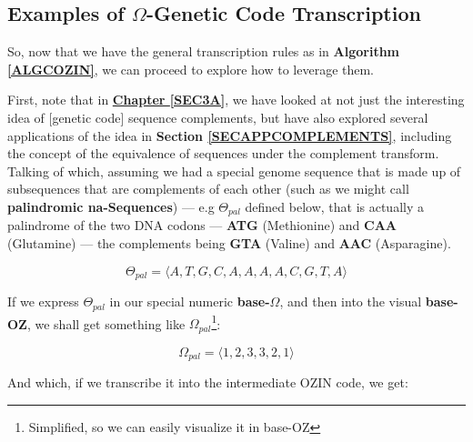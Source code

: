 \documentclass[a4paper, 18pt]{book} %
\begin{document}
\subsection{Examples of $\Omega$-Genetic Code Transcription}
\label{SECEXAMTRANSC}

So, now that we have the general transcription rules as in \textbf{Algorithm \ref{ALGCOZIN}}, we can proceed to explore how to leverage them. 

First, note that in \textbf{\hyperref[SEC3A]{Chapter \ref{SEC3A}}}, we have looked at not just the interesting idea of [genetic code] sequence complements, but have also explored several applications of the idea in \textbf{Section \ref{SECAPPCOMPLEMENTS}}, including the concept of the equivalence of sequences under the complement transform. Talking of which, assuming we had a special genome sequence that is made up of subsequences that are complements of each other (such as we might call \textbf{palindromic na-Sequences}) --- e.g $\Theta_{pal}$ defined below, that is actually a palindrome of the two DNA codons --- \textbf{ATG} (Methionine) and \textbf{CAA} (Glutamine) --- the complements being \textbf{GTA} (Valine) and \textbf{AAC} (Asparagine)\cite{wikipedia_codon_tables}.

\begin{equation}
\label{GENOMEPAL}
\Theta_{pal} = \langle A, T, G, C, A, A, A, A, C, G, T, A \rangle
\end{equation}

If we express $\Theta_{pal}$ in our special numeric \textbf{base-$\Omega$}, and then into the visual \textbf{base-OZ}, we shall get something like $\Omega_{pal}$\footnote{Simplified, so we can easily visualize it in base-OZ}:

\begin{equation}
\label{GENOMEPALOMEG}
\Omega_{pal} = \langle 1, 2, 3, 3, 2, 1 \rangle
\end{equation}

And which, if we transcribe it into the intermediate OZIN code, we get:
\end{document}
